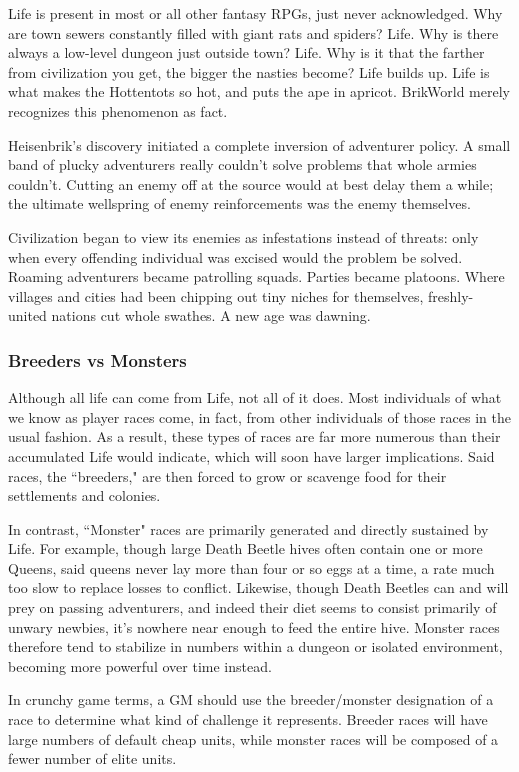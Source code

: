\documentclass[12pt,a4paper,twocolumn]{article}
\begin{document}
Life is present in most or all other fantasy RPGs, just never acknowledged.  Why are town sewers constantly filled with giant rats and spiders?  Life.  Why is there always a low-level dungeon just outside town?  Life.  Why is it that the farther from civilization you get, the bigger the nasties become?  Life builds up.  Life is what makes the Hottentots so hot, and puts the ape in apricot.  BrikWorld merely recognizes this phenomenon as fact.

Heisenbrik's discovery initiated a complete inversion of adventurer policy.  A small band of plucky adventurers really couldn't solve problems that whole armies couldn't.  Cutting an enemy off at the source would at best delay them a while; the ultimate wellspring of enemy reinforcements was the enemy themselves.  

Civilization began to view its enemies as infestations instead of threats: only when every offending individual was excised would the problem be solved.  Roaming adventurers became patrolling squads.  Parties became platoons.  Where villages and cities had been chipping out tiny niches for themselves, freshly-united nations cut whole swathes.  A new age was dawning.
\subsubsection{Breeders vs Monsters}
Although all life can come from Life, not all of it does.  Most individuals of what we know as player races come, in fact, from other individuals of those races in the usual fashion.  As a result, these types of races are far more numerous than their accumulated Life would indicate, which will soon have larger implications.  Said races, the ``breeders," are then forced to grow or scavenge food for their settlements and colonies.

In contrast, ``Monster" races are primarily generated and directly sustained by Life.  For example, though large Death Beetle hives often contain one or more Queens, said queens never lay more than four or so eggs at a time, a rate much too slow to replace losses to conflict.  Likewise, though Death Beetles can and will prey on passing adventurers, and indeed their diet seems to consist primarily of unwary newbies, it's nowhere near enough to feed the entire hive.  Monster races therefore tend to stabilize in numbers within a dungeon or isolated environment, becoming more powerful over time instead.

In crunchy game terms, a GM should use the breeder/monster designation of a race to determine what kind of challenge it represents.  Breeder races will have large numbers of default cheap units, while monster races will be composed of a fewer number of elite units.
\end{document}
